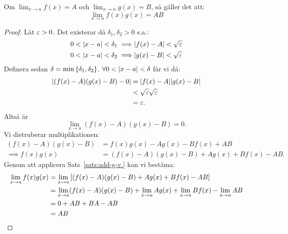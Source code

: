 \begin{theorem}\label{sats:mult-g-v.}
	Om $\lim_{x\to a}f(x)=A$ och $\lim_{x\to a}g(x)=B$, så gäller det att:
	$$
		\lim_{x\to a}f(x)g(x)=AB
	$$
	
	\begin{proof}
		Låt $\varepsilon>0$. Det existerar då $\delta_1,\delta_2>0$ s.a.:
		\begin{align*}
			0<\qty|x-a|<\delta_1\implies&\qty|f(x)-A|<\sqrt{\varepsilon}\\
			0<\qty|x-a|<\delta_2\implies&\qty|g(x)-B|<\sqrt{\varepsilon}
		\end{align*}
		Definera sedan $\delta=\min\qty{\delta_1,\delta_2}$. $\forall0<\qty|x-a|<\delta$
		får vi då:
		\begin{align*}
			\qty|(f(x)-A)(g(x)-B)-0|
			&=\qty|f(x)-A|\qty|g(x)-B|\\
			&<\sqrt{\varepsilon}\sqrt{\varepsilon}\\
			&=\varepsilon.
		\end{align*}
		Altså är
		$$
			\lim_{x\to a}(f(x)-A)(g(x)-B)=0.
		$$
		Vi distruberar multiplikationen:
		\begin{align*}
			(f(x)-A)(g(x)-B)&=f(x)g(x)-Ag(x)-Bf(x)+AB\\
			\implies f(x)g(x)&=(f(x)-A)(g(x)-B)+Ag(x)+Bf(x)-AB.
		\end{align*}
		Genom att applicera Sats~\ref{sats:add-g-v.} kan vi bestäma:
		\begin{align*}
			\lim_{x\to a}f(x)g(x)&=\lim_{x\to a}\qty[(f(x)-A)(g(x)-B)+Ag(x)+Bf(x)-AB]\\
			&=\lim_{x\to a}(f(x)-A)(g(x)-B)+\lim_{x\to a}Ag(x)+\lim_{x\to a}Bf(x)-\lim_{x\to a}AB\\
			&=0+AB+BA-AB\\
			&=AB
		\end{align*}
	\end{proof}
\end{theorem}

